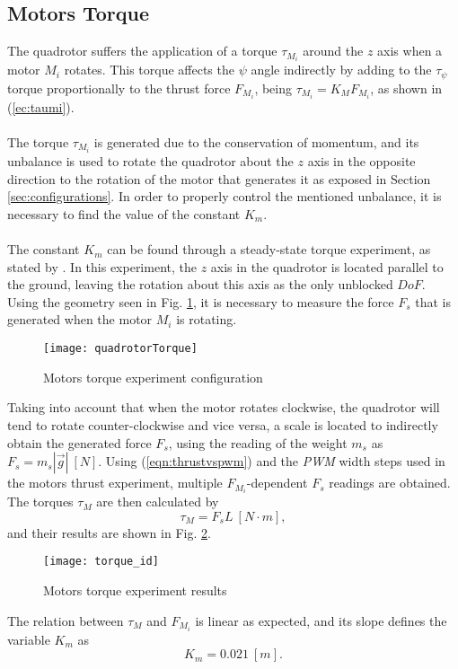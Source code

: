 \subsection{Motors Torque}
The quadrotor suffers the application of a torque $\tau_{M_{i}}$ around the $z$ axis when a motor $M_i$ rotates. This torque affects the $\psi$ angle indirectly by adding to the $\tau_\psi$ torque proportionally to the thrust force $F_{M_i}$, being $\tau_{M_i} = K_{M}F_{M_i}$, as shown in (\ref{ec:taumi}).
\\\\
The torque $\tau_{M_{i}}$ is generated due to the conservation of momentum, and its unbalance is used to rotate the quadrotor about the $z$ axis in the opposite direction to the rotation of the motor that generates it as exposed in Section \ref{sec:configurations}. In order to properly control the mentioned unbalance, it is necessary to find the value of the constant $K_m$.
\\\\
The constant $K_{m}$ can be found through a steady-state torque experiment, as stated by \cite{Oliveira2012}. In this experiment, the $z$ axis in the quadrotor is located parallel to the ground, leaving the rotation about this axis as the only unblocked $DoF$. Using the geometry seen in Fig. \ref{fig:quadrotortorque}, it is necessary to measure the force $F_s$ that is generated when the motor $M_i$ is rotating.
\begin{figure}[H]
	\begin{center}
		\texttt{[image: quadrotorTorque]}    
		\caption{Motors torque experiment configuration} 
		\label{fig:quadrotortorque}
	\end{center}
\end{figure}
Taking into account that when the motor rotates clockwise, the quadrotor will tend to rotate counter-clockwise and vice versa, a scale is located to indirectly obtain the generated force $F_{s}$, using the reading of the weight $m_s$ as $F_{s} = m_{s}|\vec{g}|\ [N]$. Using (\ref{eqn:thrustvspwm}) and the \textit{PWM} width steps used in the motors thrust experiment, multiple $F_{M_i}$-dependent $F_s$ readings are obtained. The torques $\tau_M$ are then calculated by
\begin{equation}
\tau_{M} = F_{s}L\ [N\cdot m],
\end{equation}
and their results are shown in Fig. \ref{fig:torque_id}.
\begin{figure}[H]
	\begin{center}
		\texttt{[image: torque\_id]}    
		\caption{Motors torque experiment results} 
		\label{fig:torque_id}
	\end{center}
\end{figure}
The relation between $\tau_M$ and $F_{M_i}$ is linear as expected, and its slope defines the variable $K_m$ as
\begin{equation}
K_{m} = 0.021\ [m].
\end{equation}

